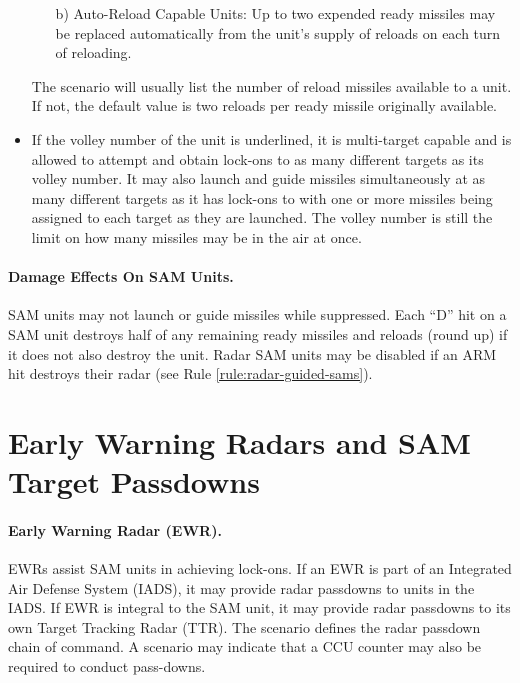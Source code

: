\begin{itemize}
\begin{enumerate}
        \item[b)] Auto-Reload Capable Units: Up to two expended ready missiles may be replaced automatically from the unit's supply of reloads on each turn of reloading.
    \end{enumerate}

    The scenario will usually list the number of reload missiles available to a unit. If not, the default value is two reloads per ready missile originally available.

    \item{} If the volley number of the unit is underlined, it is multi-target capable and is allowed to attempt and obtain lock-ons to as many different targets as its volley number. It may also launch and guide missiles simultaneously at as many different targets as it has lock-ons to with one or more missiles being assigned to each target as they are launched. The volley number is still the limit on how many missiles may be in the air at once.   

\end{itemize}

\paragraph{Damage Effects On SAM Units.} SAM units may not launch or guide missiles while suppressed. Each “D” hit on a SAM unit destroys half of any remaining ready missiles and reloads (round up) if it does not also destroy the unit. Radar SAM units may be disabled if an ARM hit destroys their radar (see Rule \ref{rule:radar-guided-sams}).


\section{Early Warning Radars and SAM Target Passdowns}

\paragraph{Early Warning Radar (EWR).} EWRs assist SAM units in achieving lock-ons. If an EWR is part of an Integrated Air Defense System (IADS), it may provide radar passdowns to units in the IADS. If EWR is integral to the SAM unit, it may provide radar passdowns to its own Target Tracking Radar (TTR). The scenario defines the radar passdown chain of command. A scenario may indicate that a CCU counter may also be required to conduct pass-downs.

